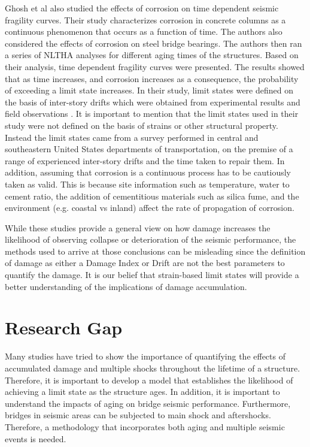Ghosh et al \cite{Ghosh2010} also studied the effects of corrosion on time dependent seismic fragility curves. Their study characterizes corrosion in concrete columns as a continuous phenomenon that occurs as a function of time. The authors also considered the effects of corrosion on steel bridge bearings. The authors then ran a series of NLTHA analyses for different aging times of the structures. Based on their analysis, time dependent fragility curves were presented. The results showed that as time increases, and corrosion increases as a consequence, the probability of exceeding a limit state increases. In their study, limit states were defined on the basis of inter-story drifts which were obtained from experimental results and field observations \cite{Padgett2007}. It is important to mention that the limit states used in their study were not defined on the basis of strains or other structural property. Instead the limit states came from a survey performed in central and southeastern United States departments of transportation, on the premise of a range of experienced inter-story drifts and the time taken to repair them. In addition, assuming that corrosion is a continuous process has to be cautiously taken as valid. This is because site information such as temperature, water to cement ratio, the addition of cementitious materials such as silica fume, and the environment (e.g. coastal vs inland) affect the rate of propagation of corrosion\cite{Thoft-Christensen}.

While these studies provide a general view on how damage increases the likelihood of observing collapse or deterioration of the seismic performance, the methods used to arrive at those conclusions can be misleading since the definition of damage as either a Damage Index or Drift are not the best parameters to quantify the damage. It is our belief that strain-based limit states will provide a better understanding of the implications of damage accumulation.

\section{Research Gap}

Many studies have tried to show the importance of quantifying the effects of accumulated damage and multiple shocks throughout the lifetime of a structure.  Therefore, it is important to develop a model that establishes the likelihood of achieving a limit state as the structure ages. In addition,  it is important to understand the impacts of aging on bridge seismic performance. Furthermore, bridges in seismic areas can be subjected to main shock and aftershocks. Therefore, a methodology that incorporates both aging and multiple seismic events is needed.

